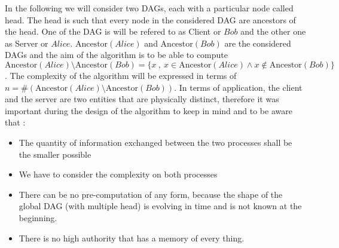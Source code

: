 In the following we will consider two DAGs, each with a particular node called head. The head is such that every node in the considered DAG are ancestors of the head. One of the DAG is will be refered to as Client or $Bob$ and the other one as Server or $Alice$. $\mathrm{Ancestor}(Alice)$ and $\mathrm{Ancestor}(Bob)$ are the considered DAGs and the aim of the algorithm is to be able to compute $\mathrm{Ancestor}(Alice) \setminus \mathrm{Ancestor}(Bob) = \{ x\ ,\ x \in \mathrm{Ancestor}(Alice) \wedge x \notin \mathrm{Ancestor}(Bob)\}$. The complexity of the algorithm will be expressed in terms of $n = \#(\mathrm{Ancestor}(Alice) \setminus \mathrm{Ancestor}(Bob))$. In terms of application, the client and the server are two entities that are physically distinct, therefore it was important during the design of the algorithm to keep in mind and to be aware that :
\begin{itemize}
 \item The quantity of information exchanged between the two processes shall be the smaller possible
 \item We have to consider the complexity on both processes
 \item There can be no pre-computation of any form, because the shape of the global DAG (with multiple head) is evolving in time and is not known at the beginning.
 \item There is no high authority that has a memory of every thing.
\end{itemize}
